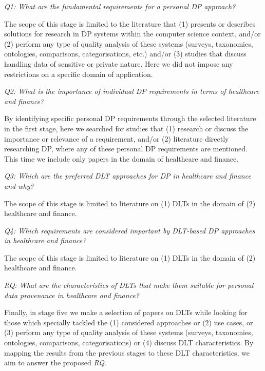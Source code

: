 \textit{Q1: What are the fundamental requirements for a personal DP approach?}

The scope of this stage is limited to the literature that (1) presents or describes solutions for research in DP systems within the computer science context, and/or (2) perform any type of quality analysis of these systems (surveys, taxonomies, ontologies, comparisons, categorisations, etc.) and/or (3) studies that discuss handling data of sensitive or private nature. Here we did not impose any restrictions on a specific domain of application.\newline

\textit{Q2: What is the importance of individual DP requirements in terms of healthcare and finance?} 

By identifying specific personal DP requirements through the selected literature in the first stage, here we searched for studies that (1) research or discuss the importance or relevance of a requirement, and/or (2) literature directly researching DP, where any of these personal DP requirements are mentioned. This time we include only papers in the domain of healthcare and finance. \newline

\textit{Q3: Which are the preferred DLT approaches for DP in healthcare and finance and why?} 

The scope of this stage is limited to literature on (1) DLTs in the domain of (2) healthcare and finance.\newline

\textit{Q4: Which requirements are considered important by DLT-based DP approaches in healthcare and finance?} 

The scope of this stage is limited to literature on (1) DLTs in the domain of (2) healthcare and finance.\newline

\textit{RQ: What are the characteristics of DLTs that make them suitable for personal data provenance in healthcare and finance?} 

Finally, in stage five we make a selection of papers on DLTs while looking for those which specially tackled the (1) considered approaches or (2) use cases, or (3) perform any type of quality analysis of these systems (surveys, taxonomies, ontologies, comparisons, categorisations) or (4) discuss DLT characteristics. By mapping the results from the previous stages to these DLT characteristics, we aim to answer the proposed \textit{RQ}.\newline

